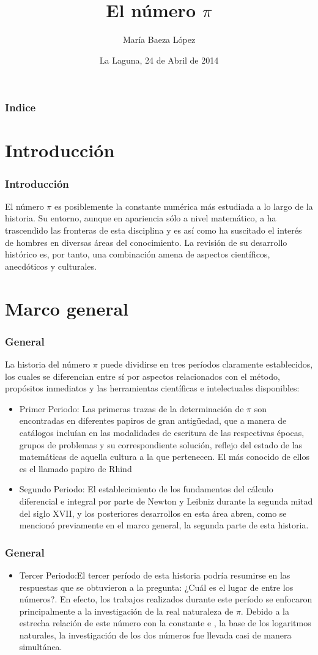 \documentclass{beamer}
\title {El número $\pi$}
\author[Maria]{María Baeza López}
\institute{Facultad de Matemáticas}
\date[24/04/2014]{La Laguna, 24 de Abril de 2014}
\begin{document}
\begin{frame} 
\titlepage 
\end {frame}
\begin{frame} 
\frametitle{Indice}
\tableofcontents[pausesections]
\end {frame}
\section {Introducción}
\begin{frame} 
\frametitle{Introducción}
El número $\pi$ es posiblemente la constante numérica más estudiada a lo largo de la historia. Su entorno, aunque en apariencia sólo a nivel matemático, a ha 
trascendido las fronteras de esta disciplina y es así como ha suscitado el interés de hombres en diversas áreas del conocimiento. La revisión de su desarrollo 
histórico es, por tanto, una combinación amena de aspectos científicos, anecdóticos y culturales.
\end {frame}
\section {Marco general}
\begin{frame} 
\frametitle{General}
La historia del número $\pi$ puede dividirse en tres períodos claramente establecidos, los cuales se diferencian entre sí por aspectos relacionados con el método,
propósitos inmediatos y las herramientas científicas e intelectuales disponibles:
\begin{itemize}
\item Primer Periodo: Las primeras trazas de la determinación de $\pi$ son encontradas en diferentes papiros de gran antigüedad, que a manera de catálogos incluían en las modalidades de 
escritura de las respectivas épocas, grupos de problemas y su correspondiente solución, reflejo del estado de las matemáticas de aquella cultura a la que pertenecen.
El más conocido de ellos es el llamado papiro de Rhind \pause
\item Segundo Periodo: El establecimiento de los fundamentos del cálculo diferencial e integral por parte de Newton y Leibniz durante la segunda mitad del siglo XVII, y los posteriores
desarrollos en esta área abren, como se mencionó previamente en el marco general, la segunda parte de esta historia.
\end{itemize}
\end {frame}
\begin{frame} 
\frametitle{General}
\begin{itemize}
\item Tercer Periodo:El tercer período de esta historia podría resumirse en las respuestas que se obtuvieron a la pregunta: ¿Cuál es el lugar de entre los números?. En efecto, los trabajos
realizados durante este período se enfocaron principalmente a la investigación de la real naturaleza de $\pi$.
Debido a la estrecha relación de este número con la constante e , la base de los logaritmos naturales, la investigación de los dos números fue llevada casi de manera 
simultánea.
\end{itemize}
\end {frame}
\end{document}
